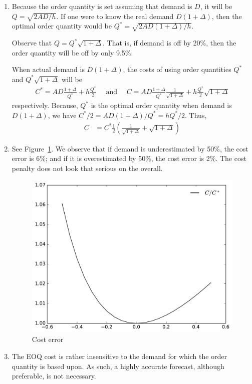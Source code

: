   \begin{solution}
\begin{enumerate}
\item Because the order quantity is set assuming that demand is $D$, it will be $Q=\sqrt{2AD/h}$. If one were to know the real demand $D(1+\Delta)$, then the optimal order quantity would be $Q^*=\sqrt{2AD(1+\Delta)/h}$. 

Observe that $Q=Q^*\sqrt{1+\Delta}$. That is, if demand is off by 20\%, then the order quantity will be off by only 9.5\%.

When actual demand is $D(1+\Delta)$, the costs of using order quantities $Q^*$ and $Q^*\sqrt{1+\Delta}$ will be 
\begin{align*}
C^* = AD\frac{1+\Delta}{Q^*}+ h\frac{Q^*}{2} \quad \text{ and } \quad C = AD\frac{1+\Delta}{Q^*}\frac{1}{\sqrt{1+\Delta}}+h\frac{Q^*}{2}\sqrt{1+\Delta}
\end{align*}
respectively. Because, $Q^*$ is the optimal order quantity when demand is $D(1+\Delta)$, we have $C^*/2=AD(1+\Delta)/Q^*=hQ^*/2$. Thus, 
\begin{align*}
C & = C^*\frac{1}{2}\left(\frac{1}{\sqrt{1+\Delta}}+\sqrt{1+\Delta}\right)
\end{align*}
\item See Figure~\ref{fig:costerror}. We observe that if demand is underestimated by 50\%, the cost error is 6\%; and if it is overestimated by 50\%, the cost error is 2\%. The cost penalty does not look that serious on the overall.

\begin{figure}
\centering
\includegraphics[width=.5\linewidth]{figures/Figure_1.pdf}
\caption{Cost error}
\label{fig:costerror}
\end{figure}

\item The EOQ cost is rather insensitive to the demand for which the order quantity is based upon. As such, a highly accurate forecast, although preferable, is not necessary. 
\end{enumerate}
    
  \end{solution}


